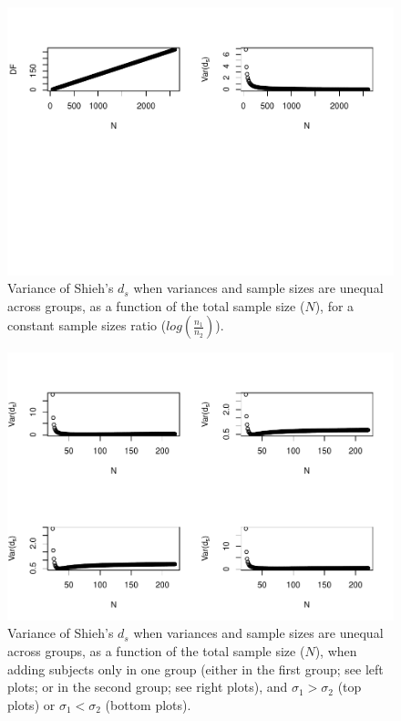 \documentclass[
  english,
  man]{apa6}
\begin{document}
\begin{figure}
\centering
\includegraphics{Theoretical-Variance-of-all-estimators-as-a-function-of-population-parameters_files/figure-latex/varshiehhetunbalNsize2-1.pdf}
\caption{\label{fig:varshiehhetunbalNsize2}Variance of Shieh's \(d_s\) when variances and sample sizes are unequal across groups, as a function of the total sample size (\(N\)), for a constant sample sizes ratio (\(log\left(\frac{n_1}{n_2} \right)\)).}
\end{figure}

\begin{figure}
\centering
\includegraphics{Theoretical-Variance-of-all-estimators-as-a-function-of-population-parameters_files/figure-latex/varshiehhetunbalNsize4-1.pdf}
\caption{\label{fig:varshiehhetunbalNsize4}Variance of Shieh's \(d_s\) when variances and sample sizes are unequal across groups, as a function of the total sample size (\(N\)), when adding subjects only in one group (either in the first group; see left plots; or in the second group; see right plots), and \(\sigma_1 > \sigma_2\) (top plots) or \(\sigma_1 < \sigma_2\) (bottom plots).}
\end{figure}
\end{document}
